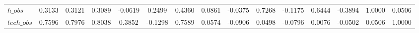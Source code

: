 \begin{center}
\begin{longtable}{lcccccccccccccc}
$h\_obs         $	 & 	           0.3133	 & 	           0.3121	 & 	           0.3089	 & 	          -0.0619	 & 	           0.2499	 & 	           0.4360	 & 	           0.0861	 & 	          -0.0375	 & 	           0.7268	 & 	          -0.1175	 & 	           0.6444	 & 	          -0.3894	 & 	           1.0000	 & 	           0.0506 \\ 
$tech\_obs      $	 & 	           0.7596	 & 	           0.7976	 & 	           0.8038	 & 	           0.3852	 & 	          -0.1298	 & 	           0.7589	 & 	           0.0574	 & 	          -0.0906	 & 	           0.0498	 & 	          -0.0796	 & 	           0.0076	 & 	          -0.0502	 & 	           0.0506	 & 	           1.0000 \\ 
\end{longtable}
 \end{center}
